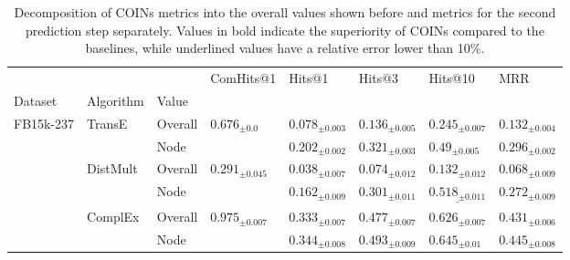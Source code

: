 \begin{table}[!ht]
  \caption[Decomposition of COINs metrics into the overall values and metrics for the second prediction step separately.]{Decomposition of COINs metrics into the overall values shown before and metrics for the second prediction step separately. Values in bold indicate the superiority of COINs compared to the baselines, while underlined values have a relative error lower than 10\%.}
  \label{tab:performance_query_answering_2}%
  \centering
  \begin{adjustbox}{width=\textwidth}%
\begin{tabular}{llllllll}
\toprule
         &           &      &                ComHits@1 &                             Hits@1 &                             Hits@3 &                            Hits@10 &                                MRR \\
Dataset & Algorithm & Value &                          &                                    &                                    &                                    &                                    \\
\midrule
FB15k-237 & TransE & Overall &    ${{0.676}_{\pm 0.0}}$ &            ${{0.078}_{\pm 0.003}}$ &            ${{0.136}_{\pm 0.005}}$ &            ${{0.245}_{\pm 0.007}}$ &            ${{0.132}_{\pm 0.004}}$ \\
         &           & Node &                          &     $\mathbf{{0.202}_{\pm 0.002}}$ &     $\mathbf{{0.321}_{\pm 0.003}}$ &      $\mathbf{{0.49}_{\pm 0.005}}$ &     $\mathbf{{0.296}_{\pm 0.002}}$ \\
         & DistMult & Overall &  ${{0.291}_{\pm 0.045}}$ &            ${{0.038}_{\pm 0.007}}$ &            ${{0.074}_{\pm 0.012}}$ &            ${{0.132}_{\pm 0.012}}$ &            ${{0.068}_{\pm 0.009}}$ \\
         &           & Node &                          &            ${{0.162}_{\pm 0.009}}$ &            ${{0.301}_{\pm 0.011}}$ &  $\underline{{0.518}_{\pm 0.011}}$ &            ${{0.272}_{\pm 0.009}}$ \\
         & ComplEx & Overall &  ${{0.975}_{\pm 0.007}}$ &     $\mathbf{{0.333}_{\pm 0.007}}$ &     $\mathbf{{0.477}_{\pm 0.007}}$ &     $\mathbf{{0.626}_{\pm 0.007}}$ &     $\mathbf{{0.431}_{\pm 0.006}}$ \\
         &           & Node &                          &     $\mathbf{{0.344}_{\pm 0.008}}$ &     $\mathbf{{0.493}_{\pm 0.009}}$ &      $\mathbf{{0.645}_{\pm 0.01}}$ &     $\mathbf{{0.445}_{\pm 0.008}}$ \\

\end{tabular}
\end{adjustbox}
\end{table}
